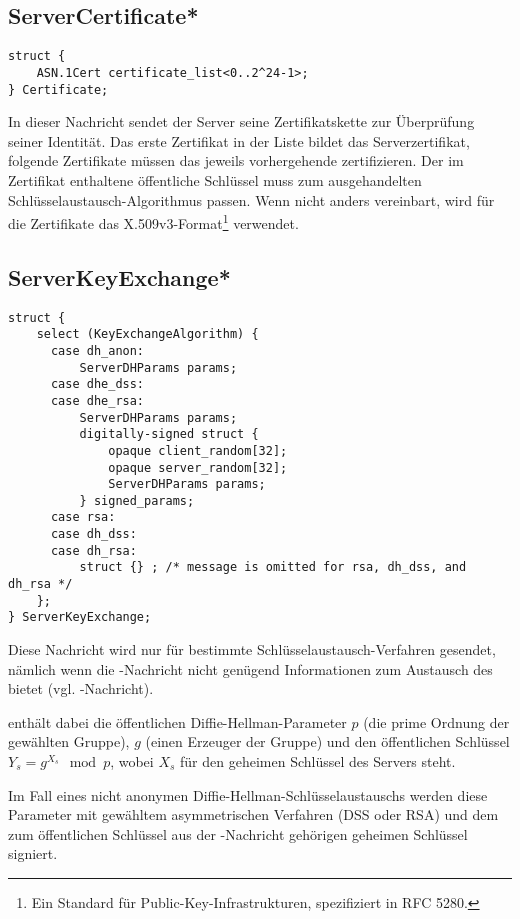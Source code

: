 \subsection{ServerCertificate*}

\begin{lstlisting}
struct {
	ASN.1Cert certificate_list<0..2^24-1>;
} Certificate;
\end{lstlisting}

In dieser Nachricht sendet der Server seine Zertifikatskette zur Überprüfung seiner Identität. Das erste Zertifikat in der Liste bildet das Serverzertifikat, folgende Zertifikate müssen das jeweils vorhergehende zertifizieren. Der im Zertifikat enthaltene öffentliche Schlüssel muss zum ausgehandelten Schlüsselaustausch-Algorithmus passen. Wenn nicht anders vereinbart, wird für die Zertifikate das X.509v3-Format\footnote{Ein Standard für Public-Key-Infrastrukturen, spezifiziert in RFC 5280.} verwendet.

\subsection{ServerKeyExchange*}

\begin{lstlisting}
struct {
	select (KeyExchangeAlgorithm) {
	  case dh_anon:
	      ServerDHParams params;
	  case dhe_dss:
	  case dhe_rsa:
	      ServerDHParams params;
	      digitally-signed struct {
	          opaque client_random[32];
	          opaque server_random[32];
	          ServerDHParams params;
	      } signed_params;
	  case rsa:
	  case dh_dss:
	  case dh_rsa:
	      struct {} ; /* message is omitted for rsa, dh_dss, and dh_rsa */
	};
} ServerKeyExchange;
\end{lstlisting}

Diese Nachricht wird nur für bestimmte Schlüsselaustausch-Verfahren gesendet, nämlich wenn die \servercertificate{}-Nachricht nicht genügend Informationen zum Austausch des \premastersecret{} bietet (vgl. \clientkeyexchange{}-Nachricht).

 enthält dabei die öffentlichen Diffie-Hellman-Parameter \(p\) (die prime Ordnung der gewählten Gruppe), \(g\) (einen Erzeuger der Gruppe) und den öffentlichen Schlüssel \(Y_s = g^{X_s} \mod{p}\), wobei \(X_s\) für den geheimen Schlüssel des Servers steht.

Im Fall eines nicht anonymen Diffie-Hellman-Schlüsselaustauschs werden diese Parameter mit gewähltem asymmetrischen Verfahren (DSS oder RSA) und dem zum öffentlichen Schlüssel aus der \servercertificate{}-Nachricht gehörigen geheimen Schlüssel signiert.

